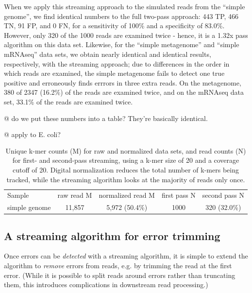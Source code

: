 \documentclass{article}
\begin{document}

When we apply this streaming approach to the simulated reads from the
``simple genome'', we find identical numbers to the full two-pass
approach: 443 TP, 466 TN, 91 FP, and 0 FN, for a sensitivity of 100\%
and a specificity of 83.0\%.  However, only 320 of the 1000 reads are
examined twice - hence, it is a 1.32x pass algorithm on this data set.
Likewise, for the ``simple metagenome''
and ``simple mRNAseq'' data sets, we obtain nearly identical and
identical results, respectively, with the streaming approach; due to
differences in the order in which reads are examined, the simple
metagenome fails to detect one true positive and erroneously finds
errrors in three extra reads.  On the metagenome, 380 of 2347 (16.2\%) of
the reads are examined twice, and on the mRNAseq data set, 33.1\% of the
reads are examined twice.

@ do we put these numbers into a table? They're basically identical.

@ apply to E. coli?

\begin{table}
\begin{tabular}{|l|c|c|c|c|}
\hline
Sample & raw read M & normalized read M & first pass N & second pass N \\
simple genome & 11,857 & 5,972 (50.4\%) & 1000 & 320 (32.0\%) \\
\hline
\end{tabular}
\label{tab:streaming_counts}

\caption{Unique k-mer counts (M) for raw and normalized data sets, and
read counts (N) for first- and second-pass streaming, using a k-mer size
of 20 and a coverage cutoff of 20.  Digital normalization reduces the
total number of k-mers being tracked, while the streaming algorithm
looks at the majority of reads only once.}
\end{table}


\subsection{A streaming algorithm for error trimming}

Once errors can be {\em detected} with a streaming algorithm, it is
simple to extend the algorithm to {\em remove} errors from reads,
e.g. by trimming the read at the first error.  (While it is possible
to split reads around errors rather than truncating them, this
introduces complications in downstream read processing.)
\end{document}
